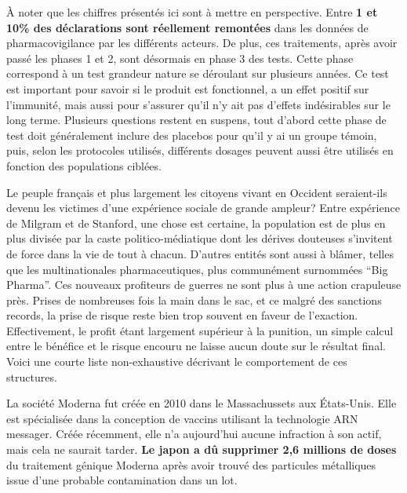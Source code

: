 \documentclass[a4paper]{article}
\begin{document}
\begin{multicols}{3}
  À noter que les chiffres présentés ici sont à mettre en
  perspective. Entre \textbf{1 et 10\% des déclarations sont
    réellement remontées} \cite{Study:UnderReporting} dans les données
  de pharmacovigilance par les différents acteurs. De plus, ces
  traitements, après avoir passé les phases 1 et 2, sont désormais en
  phase 3 des tests. Cette phase correspond à un test grandeur nature
  se déroulant sur plusieurs années. Ce test est important pour savoir
  si le produit est fonctionnel, a un effet positif sur l'immunité,
  mais aussi pour s'assurer qu'il n'y ait pas d'effets indésirables
  sur le long terme. Plusieurs questions restent en suspens, tout
  d'abord cette phase de test doit généralement inclure des placebos
  pour qu'il y ai un groupe témoin, puis, selon les protocoles
  utilisés, différents dosages peuvent aussi être utilisés en fonction
  des populations ciblées.

  \closearticle


  Le peuple français et plus largement les citoyens vivant en Occident
  seraient-ils devenu les victimes d'une expérience sociale de grande
  ampleur? Entre expérience de Milgram et de Stanford, une chose est
  certaine, la population est de plus en plus divisée par la caste
  politico-médiatique dont les dérives douteuses s'invitent de force
  dans la vie de tout à chacun. D'autres entités sont aussi à blâmer,
  telles que les multinationales pharmaceutiques, plus communément
  surnommées “Big Pharma”. Ces nouveaux profiteurs de guerres ne sont
  plus à une action crapuleuse près. Prises de nombreuses fois la main
  dans le sac, et ce malgré des sanctions records, la prise de risque
  reste bien trop souvent en faveur de l'exaction. Effectivement, le
  profit étant largement supérieur à la punition, un simple calcul
  entre le bénéfice et le risque encouru ne laisse aucun doute sur le
  résultat final. Voici une courte liste non-exhaustive décrivant le
  comportement de ces structures.

  La société Moderna fut créée en 2010 dans le Massachussets aux
  États-Unis. Elle est spécialisée dans la conception de vaccins
  utilisant la technologie ARN messager. Créée récemment, elle n'a
  aujourd'hui aucune infraction à son actif, mais cela ne saurait
  tarder. \textbf{Le japon a dû supprimer 2,6 millions de doses}
  \cite{NewsWeek:JapanModerna} du traitement génique Moderna après
  avoir trouvé des particules métalliques issue d'une probable
  contamination dans un lot.


\end{multicols}
\end{document}
